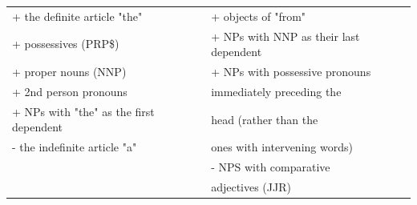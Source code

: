 \documentclass[portrait,final]{baposter}
\begin{document}
\begin{poster}
{\begin{center}
\begin{tabular}{|l|l|}
\\\hline %
+ the definite article "the" & + objects of "from"\\
+ possessives (PRP\$)& + NPs with NNP as their last dependent\\
+ proper nouns (NNP)& + NPs with possessive pronouns\\
+ 2nd person pronouns& \phantom{+ }immediately preceding the\\
+ NPs with "the" as the first dependent & \phantom{+ }head (rather than the\\
- the indefinite article "a" & \phantom{+ }ones with intervening words)\\
& - NPS with comparative \\
& \phantom{- }adjectives (JJR)\\\hline
\end{tabular}
 \end{center}

}

\end{poster}%
\end{document}
